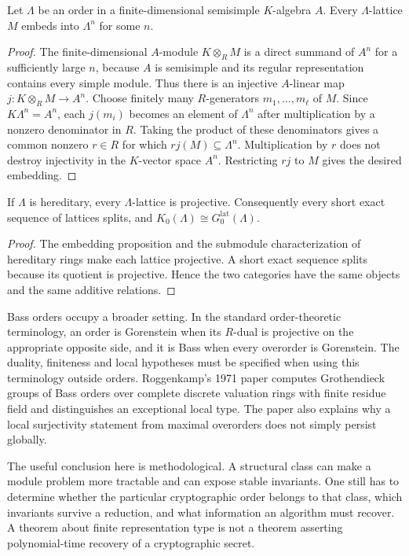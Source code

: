 \begin{proposition}
Let $\Lambda$ be an order in a finite-dimensional semisimple $K$-algebra $A$. Every $\Lambda$-lattice $M$ embeds into $\Lambda^n$ for some $n$.
\end{proposition}
\begin{proof}
The finite-dimensional $A$-module $K\otimes_R M$ is a direct summand of $A^n$ for a sufficiently large $n$, because $A$ is semisimple and its regular representation contains every simple module. Thus there is an injective $A$-linear map $j:K\otimes_RM\to A^n$. Choose finitely many $R$-generators $m_1,\ldots,m_\ell$ of $M$. Since $K\Lambda^n=A^n$, each $j(m_i)$ becomes an element of $\Lambda^n$ after multiplication by a nonzero denominator in $R$. Taking the product of these denominators gives a common nonzero $r\in R$ for which $rj(M)\subseteq\Lambda^n$. Multiplication by $r$ does not destroy injectivity in the $K$-vector space $A^n$. Restricting $rj$ to $M$ gives the desired embedding.
\end{proof}

\begin{corollary}
If $\Lambda$ is hereditary, every $\Lambda$-lattice is projective. Consequently every short exact sequence of lattices splits, and $K_0(\Lambda)\cong G_0^{\mathrm{lat}}(\Lambda)$.
\end{corollary}
\begin{proof}
The embedding proposition and the submodule characterization of hereditary rings make each lattice projective. A short exact sequence splits because its quotient is projective. Hence the two categories have the same objects and the same additive relations.
\end{proof}

Bass orders occupy a broader setting. In the standard order-theoretic terminology, an order is Gorenstein when its $R$-dual is projective on the appropriate opposite side, and it is Bass when every overorder is Gorenstein. The duality, finiteness and local hypotheses must be specified when using this terminology outside orders. Roggenkamp's 1971 paper computes Grothendieck groups of Bass orders over complete discrete valuation rings with finite residue field and distinguishes an exceptional local type. The paper also explains why a local surjectivity statement from maximal overorders does not simply persist globally.\cite{v2RoggenkampBass1971}

The useful conclusion here is methodological. A structural class can make a module problem more tractable and can expose stable invariants. One still has to determine whether the particular cryptographic order belongs to that class, which invariants survive a reduction, and what information an algorithm must recover. A theorem about finite representation type is not a theorem asserting polynomial-time recovery of a cryptographic secret.

